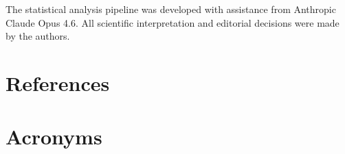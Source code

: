 \documentclass[TS,lsstdraft,authoryear,toc]{lsstdoc}
\begin{document}
The statistical analysis pipeline was developed with assistance from Anthropic Claude Opus 4.6. All scientific interpretation and editorial decisions were made by the authors. 

\section{References} \label{sec:bib}
\renewcommand{\refname}{} %


\section{Acronyms} \label{sec:acronyms}

\end{document}
